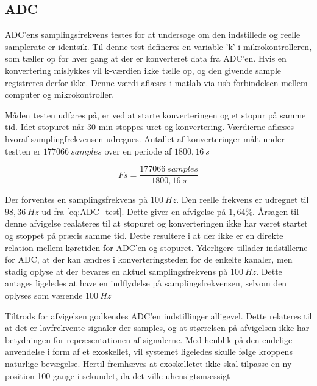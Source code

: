 \subsection{ADC}
ADC'ens samplingsfrekvens testes for at undersøge om den indstillede og reelle samplerate er identsik. Til denne test defineres en variable 'k' i mikrokontrolleren, som tæller op for hver gang at der er konverteret data fra ADC'en. Hvis en konvertering mislykkes vil k-værdien ikke tælle op, og den givende sample registreres derfor ikke. Denne værdi aflæses i matlab via usb forbindelsen mellem computer og mikrokontroller. 

Måden testen udføres på, er ved at starte konverteringen og et stopur på samme tid. Idet stopuret når 30 min stoppes uret og konvertering. Værdierne aflæses hvoraf samplingfrekvensen udregnes. Antallet af konverteringer målt under testten er $177066~samples$ over en periode af $1800,16~s$

\begin{equation}\label{eq:ADC_test}
Fs = \frac{177066~samples}{1800,16~s}
\end{equation}

Der forventes en samplingsfrekvens på $100~Hz$. Den reelle frekvens er udregnet til $98,36~Hz$ ud fra \autoref{eq:ADC_test}. Dette giver en afvigelse på $1,64\%$. Årsagen til denne afvigelse realateres til at stopuret og konverteringen ikke har været startet og stoppet på præcis samme tid. Dette resultere i at der ikke er en direkte relation mellem køretiden for ADC'en og stopuret. Yderligere tillader indstillerne for ADC, at der kan ændres i konverteringsteden for de enkelte kanaler, men stadig oplyse at der bevares en aktuel samplingsfrekvens på $100~Hz$. Dette antages ligeledes at have en indflydelse på samplingsfrekvensen, selvom den oplyses som værende $100~Hz$ 

Tiltrods for afvigelsen godkendes ADC'en indstillinger alligevel. Dette relateres til at det er lavfrekvente signaler der samples, og at størrelsen på afvigelsen ikke har betydningen for repræsentationen af signalerne. 
Med henblik på den endelige anvendelse i form af et exoskellet, vil systemet ligeledes skulle følge kroppens naturlige bevægelse. Hertil fremhæves at exoskelletet ikke skal tilpasse en ny position 100 gange i sekundet, da det ville uhensigtsmæssigt

